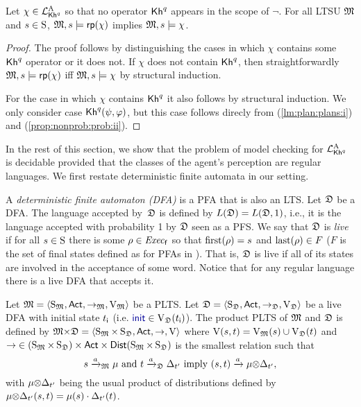\begin{proposition}\label{prop:Khunc:PKhadapt}
  Let $\chi\in\PKhadapt$ so that no operator $\kh^q$ appears in the
  scope of $\neg$.  For all LTSU $\model$
  and $s\in\S$, $\model,s\models\fgetprob(\chi)$ implies
  $\model,s\models\chi$.
\end{proposition}
%
\begin{proof}
  The proof follows by distinguishing the cases in which $\chi$
  contains some $\kh^q$ operator or it does not.
  If $\chi$ does not contain $\kh^q$, then straightforwardly
  $\model,s\models\fgetprob(\chi)$ iff $\model,s\models\chi$ by
  structural induction.

  For the case in which $\chi$ contains $\kh^q$ it also
  follows by structural induction.  We only consider case
  $\kh^q(\psi,\varphi)$, but this case follows direcly from
   (\cref{lm:plan:plans:i}) and
   (\cref{prop:nonprob:prob:ii}).
\end{proof}

In the rest of this section, we show that the problem of model
checking for $\PKhadapt$ is decidable provided that the classes of the
agent's perception are regular languages.  We first restate
deterministic finite automata in our setting.

A \emph{deterministic finite automaton (DFA)} is a PFA that is also an 
LTS. Let $\dfa$ be a DFA.  The language accepted by~$\dfa$ is defined
by $L(\dfa)=L(\dfa,1)$, i.e., it is the language accepted with
probability 1 by $\dfa$ seen as a PFS.
%
We say that $\dfa$ is \emph{live} if for all $s\in\S$ there is some
$\rho\in\execf$ so that $\first(\rho)=s$ and $\last(\rho)\in F$ ($F$
is the set of final states defined as for PFAs in
).  That is, $\dfa$ is live if all of its
states are involved in the acceptance of some word.  Notice that for
any regular language there is a live DFA that accepts it.

Let $\model=\tup{\S_\model,\Act,\ra_\model,\V_\model}$ be a PLTS.
%
Let $\dfa=\tup{\S_\dfa,\Act,\ra_\dfa,\V_\dfa}$ be a live DFA with
initial state $\tini$ (i.e. $\init\in\V_\dfa(\tini)$).  The product
PLTS of $\model$ and $\dfa$ is defined by
$\model{\times}\dfa=\tup{\S_\model{\times}\S_\dfa,\Act,\ra,\V}$
where $\V(s,t)=\V_\model(s)\cup\V_\dfa(t)$ and
${\ra}\in{(\S_\model{\times}\S_\dfa)}\times\Act\times\Dist({\S_\model{\times}\S_\dfa})$
is the smallest relation such that
%
\[s\reach{a}_\model\mu \text{ and } t\reach{a}_\dfa\Dirac_{t'} \text{ imply } (s,t)\reach{a}{\mu{\otimes}\Dirac_{t'}},\]
%
with $\mu{\otimes}\Dirac_{t'}$ being the usual product of distributions
defined by $\mu{\otimes}\Dirac_{t'}(s,t)= \mu(s)\cdot\Dirac_{t'}(t)$.


